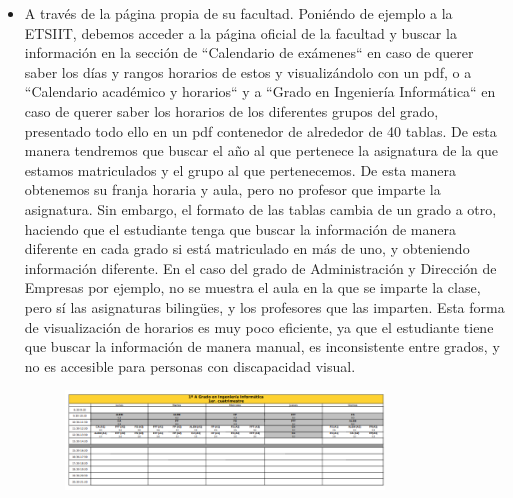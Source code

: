 \begin{itemize}
    \item A través de la página propia de su facultad. Poniéndo de ejemplo a la ETSIIT, debemos acceder a la página oficial de la facultad \cite{webETSIIT} y buscar la información en la sección
          de ``Calendario de exámenes`` en caso de querer saber los días y rangos horarios de estos y visualizándolo con un pdf, o a ``Calendario académico y horarios`` y a ``Grado en Ingeniería Informática``
          en caso de querer saber los horarios de los diferentes grupos del grado, presentado todo ello en un pdf contenedor de alrededor de 40 tablas.
          \newline\newline
          De esta manera tendremos que buscar el año al que pertenece la asignatura de la que estamos matriculados y el grupo al que pertenecemos. De esta manera obtenemos su 
          franja horaria y aula, pero no profesor que imparte la asignatura.
          \newline\newline
          Sin embargo, el formato de las tablas cambia de un grado a otro, haciendo que el estudiante tenga que buscar la información de manera diferente en cada grado si está matriculado en más de uno, 
          y obteniendo información diferente. En el caso del grado de Administración y Dirección de Empresas por ejemplo, no se muestra el aula en la que se imparte la clase, pero sí las asignaturas bilingües, y
          los profesores que las imparten.
          \newline\newline
          Esta forma de visualización de horarios es muy poco eficiente, ya que el estudiante tiene que buscar la información de manera manual, es inconsistente entre grados, y no es accesible para personas con discapacidad visual.
          \newpage
            \begin{figure}[H]
                \centering
                \includegraphics[width=0.8\textwidth]{figures/02_etsiit_horario.png}

\end{figure}
\end{itemize}
